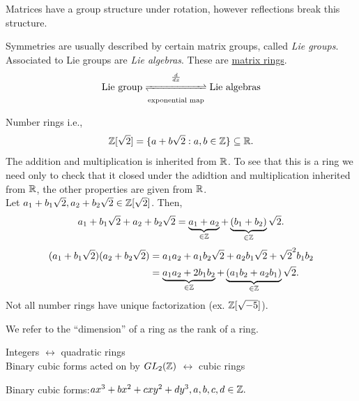\documentclass[twoside, openright, fontsize=10pt, headings=big]{scrbook}
\begin{document}
\begin{remark}
    Matrices have a group structure under rotation, however reflections break this structure.
\end{remark}
Symmetries are usually described by certain matrix groups, called \textit{Lie groups}. Associated to Lie groups are \textit{Lie algebras}. These are \underline{matrix rings}.
\[
    \text{Lie group}\underset{\text{exponential map}}{\overset{\frac{d}{dx}}{\xrightleftharpoons{\hspace{2cm}}}}\text{Lie algebras}
\]
\begin{example}{}{}
    Number rings i.e.,
    \[
        \mathbb{Z}[\sqrt{2}]=\{a+b\sqrt{2}:a,b\in\mathbb{Z}\}\subseteq\mathbb{R}.
    \]
    The addition and multiplication is inherited from $\mathbb{R}$.
    To see that this is a ring we need only to check that it closed under the adidtion and multiplication inherited from $\mathbb{R}$, the other properties are given from $\mathbb{R}$.\\
    Let $a_1+b_1\sqrt{2},a_2+b_2\sqrt{2}\in\mathbb{Z}[\sqrt{2}]$. Then,
    \[
        a_1+b_1\sqrt{2}+a_2+b_2\sqrt{2}=\underbrace{a_1+a_2}_{\in\mathbb{Z}}+\underbrace{(b_1+b_2)}_{\in\mathbb{Z}}\sqrt{2}.
    \]
    \begin{align*}
        (a_1+b_1\sqrt{2})(a_2+b_2\sqrt{2})&=a_1a_2+a_1b_2\sqrt{2}+a_2b_1\sqrt{2}+\sqrt{2}^2b_1b_2\\
        &=\underbrace{a_1a_2+2b_1b_2}_{\in\mathbb{Z}}+\underbrace{(a_1b_2+a_2b_1)}_{\in\mathbb{Z}}\sqrt{2}.
    \end{align*}
    Not all number rings have unique factorization (ex. $\mathbb{Z}[\sqrt{-5}]$).\\
\end{example}
\begin{remark}
    We refer to the ``dimension'' of a ring as the rank of a ring.
\end{remark}
\begin{center}
    Integers $\leftrightarrow$ quadratic rings\\
    Binary cubic forms acted on by $GL_2(\mathbb{Z})$ $\leftrightarrow$ cubic rings 
\end{center}
\begin{remark}
    Binary cubic forms:$ax^3+bx^2+cxy^2+dy^3,a,b,c,d\in\mathbb{Z}.$  
\end{remark}
\end{document}

